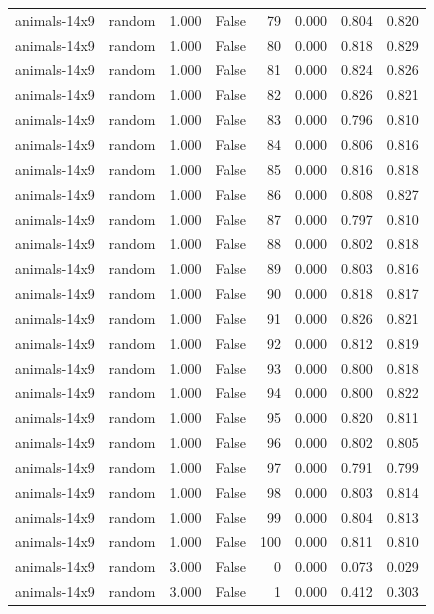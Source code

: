 \begin{tabular}{llrrrrrr}
animals-14x9 & random & 1.000 & False & 79 & 0.000 & 0.804 & 0.820 \\
animals-14x9 & random & 1.000 & False & 80 & 0.000 & 0.818 & 0.829 \\
animals-14x9 & random & 1.000 & False & 81 & 0.000 & 0.824 & 0.826 \\
animals-14x9 & random & 1.000 & False & 82 & 0.000 & 0.826 & 0.821 \\
animals-14x9 & random & 1.000 & False & 83 & 0.000 & 0.796 & 0.810 \\
animals-14x9 & random & 1.000 & False & 84 & 0.000 & 0.806 & 0.816 \\
animals-14x9 & random & 1.000 & False & 85 & 0.000 & 0.816 & 0.818 \\
animals-14x9 & random & 1.000 & False & 86 & 0.000 & 0.808 & 0.827 \\
animals-14x9 & random & 1.000 & False & 87 & 0.000 & 0.797 & 0.810 \\
animals-14x9 & random & 1.000 & False & 88 & 0.000 & 0.802 & 0.818 \\
animals-14x9 & random & 1.000 & False & 89 & 0.000 & 0.803 & 0.816 \\
animals-14x9 & random & 1.000 & False & 90 & 0.000 & 0.818 & 0.817 \\
animals-14x9 & random & 1.000 & False & 91 & 0.000 & 0.826 & 0.821 \\
animals-14x9 & random & 1.000 & False & 92 & 0.000 & 0.812 & 0.819 \\
animals-14x9 & random & 1.000 & False & 93 & 0.000 & 0.800 & 0.818 \\
animals-14x9 & random & 1.000 & False & 94 & 0.000 & 0.800 & 0.822 \\
animals-14x9 & random & 1.000 & False & 95 & 0.000 & 0.820 & 0.811 \\
animals-14x9 & random & 1.000 & False & 96 & 0.000 & 0.802 & 0.805 \\
animals-14x9 & random & 1.000 & False & 97 & 0.000 & 0.791 & 0.799 \\
animals-14x9 & random & 1.000 & False & 98 & 0.000 & 0.803 & 0.814 \\
animals-14x9 & random & 1.000 & False & 99 & 0.000 & 0.804 & 0.813 \\
animals-14x9 & random & 1.000 & False & 100 & 0.000 & 0.811 & 0.810 \\
animals-14x9 & random & 3.000 & False & 0 & 0.000 & 0.073 & 0.029 \\
animals-14x9 & random & 3.000 & False & 1 & 0.000 & 0.412 & 0.303 \\

\end{tabular}
